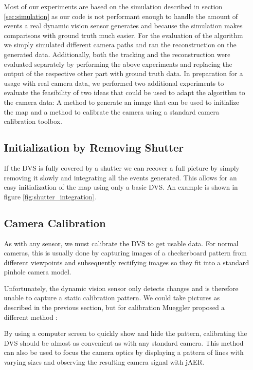 Most of our experiments are based on the simulation described in section
\ref{sec:simulation} as our code is not performant enough to handle the amount
of events a real dynamic vision sensor generates and because the simulation
makes comparisons with ground truth much easier.
For the evaluation of the algorithm we simply simulated different camera paths
and ran the reconstruction on the generated data.
Additionally, both the tracking and the reconstruction were evaluated separately
by performing the above experiments and replacing the output of the respective
other part with ground truth data.
In preparation for a usage with real camera data, we performed two additional
experiments to evaluate the feasibility of two ideas that could be used to adapt
the algorithm to the camera data:
A method to generate an image that can be used to initialize the map and a method
to calibrate the camera using a standard camera calibration toolbox.

\subsection{Initialization by Removing Shutter}
\label{sec:shutter_removal}

If the DVS is fully covered by a shutter we can recover a full picture by
simply removing it slowly and integrating all the events generated. This allows
for an easy initialization of the map using only a basic DVS. An example is shown in figure \ref{fig:shutter_integration}.


\subsection{Camera Calibration}
\label{sec:camera_calibration}

As with any sensor, we must calibrate the DVS to get usable data. For normal
cameras, this is usually done by capturing images of a checkerboard pattern from
different viewpoints and subsequently rectifying images so they fit into a
standard pinhole camera model.

Unfortunately, the dynamic vision sensor only detects changes and is therefore unable to
capture a static calibration pattern. We could take pictures as described in
the previous section, but for calibration Mueggler \etal proposed a different method \cite{mueggler2014event}:

By using a computer screen to quickly show and hide the pattern, calibrating
the DVS should be almost as convenient as with any standard camera.  This
method can also be used to focus the camera optics by displaying a pattern of
lines with varying sizes and observing the resulting camera signal with jAER.
